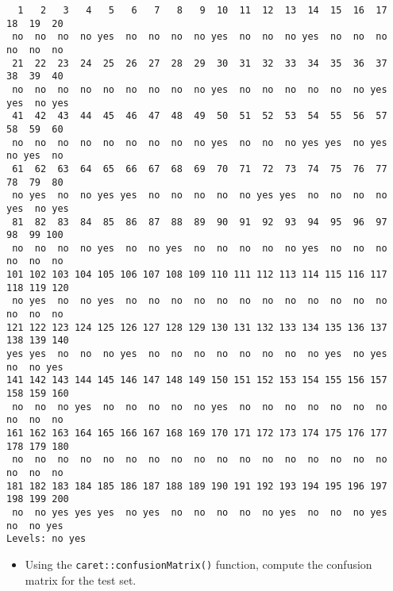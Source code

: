 \documentclass[
]{book}
\newenvironment{Shaded}{\begin{snugshade}}{\end{snugshade}}
\newcommand{\CommentTok}[1]{\textcolor[rgb]{0.56,0.35,0.01}{\textit{#1}}}
\newcommand{\DataTypeTok}[1]{\textcolor[rgb]{0.13,0.29,0.53}{#1}}
\newcommand{\KeywordTok}[1]{\textcolor[rgb]{0.13,0.29,0.53}{\textbf{#1}}}
\newcommand{\NormalTok}[1]{#1}
\newcommand{\OperatorTok}[1]{\textcolor[rgb]{0.81,0.36,0.00}{\textbf{#1}}}
\providecommand{\tightlist}{%
  \setlength{\itemsep}{0pt}\setlength{\parskip}{0pt}}
\begin{document}
\begin{verbatim}
  1   2   3   4   5   6   7   8   9  10  11  12  13  14  15  16  17  18  19  20 
 no  no  no  no yes  no  no  no  no yes  no  no  no yes  no  no  no  no  no  no 
 21  22  23  24  25  26  27  28  29  30  31  32  33  34  35  36  37  38  39  40 
 no  no  no  no  no  no  no  no  no yes  no  no  no  no  no  no yes yes  no yes 
 41  42  43  44  45  46  47  48  49  50  51  52  53  54  55  56  57  58  59  60 
 no  no  no  no  no  no  no  no  no yes  no  no  no yes yes  no yes  no yes  no 
 61  62  63  64  65  66  67  68  69  70  71  72  73  74  75  76  77  78  79  80 
 no yes  no  no yes yes  no  no  no  no  no yes yes  no  no  no  no yes  no yes 
 81  82  83  84  85  86  87  88  89  90  91  92  93  94  95  96  97  98  99 100 
 no  no  no  no yes  no  no yes  no  no  no  no  no yes  no  no  no  no  no  no 
101 102 103 104 105 106 107 108 109 110 111 112 113 114 115 116 117 118 119 120 
 no yes  no  no yes  no  no  no  no  no  no  no  no  no  no  no  no  no  no  no 
121 122 123 124 125 126 127 128 129 130 131 132 133 134 135 136 137 138 139 140 
yes yes  no  no  no yes  no  no  no  no  no  no  no  no yes  no yes  no  no yes 
141 142 143 144 145 146 147 148 149 150 151 152 153 154 155 156 157 158 159 160 
 no  no  no yes  no  no  no  no  no yes  no  no  no  no  no  no  no  no  no  no 
161 162 163 164 165 166 167 168 169 170 171 172 173 174 175 176 177 178 179 180 
 no  no  no  no  no  no  no  no  no  no  no  no  no  no  no  no  no  no  no  no 
181 182 183 184 185 186 187 188 189 190 191 192 193 194 195 196 197 198 199 200 
 no  no yes yes yes  no yes  no  no  no  no  no yes  no  no  no yes  no  no yes 
Levels: no yes
\end{verbatim}

\begin{itemize}
\tightlist
\item
  Using the \texttt{caret::confusionMatrix()} function, compute the confusion matrix for the test set.
\end{itemize}

\begin{Shaded}
\end{Shaded}
\end{document}
